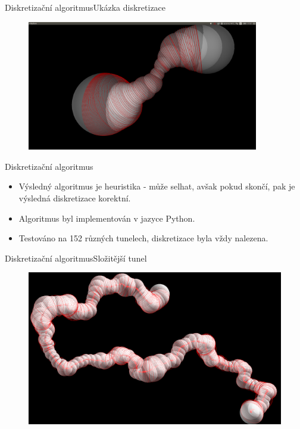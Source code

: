 \documentclass{beamer}
\begin{document}
\begin{frame}{Diskretizační algoritmus}{Ukázka diskretizace}
    \begin{figure}
        \includegraphics[width=0.9\textwidth]{img/weighted_dir.png}
    \end{figure}
\end{frame}

\begin{frame}{Diskretizační algoritmus}
    \begin{itemize}
	\item Výsledný algoritmus je heuristika - může selhat, avšak pokud skončí, pak je výsledná diskretizace korektní.
	\item Algoritmus byl implementován v jazyce Python.
	\item Testováno na 152 různých tunelech, diskretizace byla vždy nalezena.
	\end{itemize}
\end{frame}

\begin{frame}{Diskretizační algoritmus}{Složitější tunel}
    \begin{figure}
        \includegraphics[width=\textwidth]{img/1YGE.png}
    \end{figure}
\end{frame}
\end{document}
